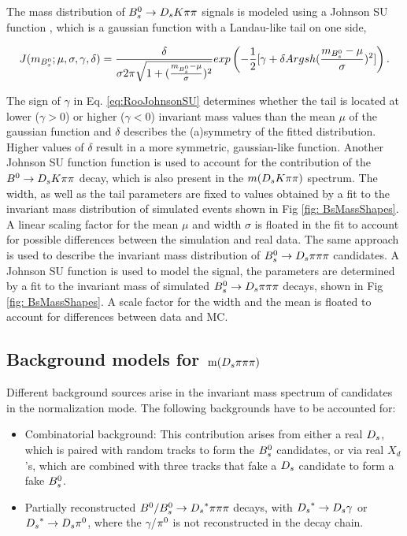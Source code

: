 The mass distribution of ${{B}^0_{s}}\rightarrow{\ensuremath{{D}_{s}}}{\ensuremath{K}}{\ensuremath{\pi}}{\ensuremath{\pi}}$ signals is modeled using a Johnson SU function \cite{10.2307/2332539}, which is a gaussian function with a Landau-like tail on one side,

\begin{equation}
J(m_{{{B}^0_{s}}};\mu,\sigma,\gamma,\delta) = \frac{\delta}{\sigma 2\pi \sqrt{1+(\frac{m_{{{B}^0_{s}}}-\mu}{\sigma})^{2}}} exp \left(-\frac{1}{2}[\gamma + \delta Argsh (\frac{m_{{{B}^0_{s}}} - \mu}{\sigma})^{2}]\right).
\label{eq:RooJohnsonSU}
\end{equation}

 
The sign of $\gamma$ in Eq. \ref{eq:RooJohnsonSU} determines whether the tail is located at lower ($\gamma > 0$) or higher ($\gamma < 0$) invariant mass values than the mean $\mu$ of the gaussian function 
and $\delta$ describes the (a)symmetry of the fitted distribution. Higher values of $\delta$ result in a more symmetric, gaussian-like function.    
Another Johnson SU function function is used to account for the contribution of the ${B}^{0}\rightarrow{\ensuremath{{D}_{s}}}{\ensuremath{K}}{\ensuremath{\pi}}{\ensuremath{\pi}}$ decay, which is also present in the $m({{D}_{s}}{K}{\pi}{\pi})$ spectrum.
The width, as well as the tail parameters are fixed to values obtained by a fit to the invariant mass distribution of simulated events shown in Fig \ref{fig: BsMassShapes}. 
A linear scaling factor for the mean $\mu$ and width $\sigma$ is floated in the fit to account for possible differences between the simulation and real data. \newline
The same approach is used to describe the invariant mass distribution of ${{B}^0_{s}}\rightarrow{\ensuremath{{D}_{s}}}{\ensuremath{\pi}}{\ensuremath{\pi}}{\ensuremath{\pi}}$ candidates. 
A  Johnson SU function is used to model the signal, the parameters are determined by a fit to the invariant mass of simulated ${{B}^0_{s}}\rightarrow{\ensuremath{{D}_{s}}}{\ensuremath{\pi}}{\ensuremath{\pi}}{\ensuremath{\pi}}$ decays, shown in Fig \ref{fig: BsMassShapes}.
A scale factor for the width and the mean is floated to account for differences between data and MC.

\subsection{Background models for $\mathrm{ \,m}({{D}_{s}}{\pi}{\pi}{\pi})$} 
\label{subsec: BkginNorm}
Different background sources arise in the invariant mass spectrum of candidates in the normalization mode. \newline
The following backgrounds have to be accounted for:
\begin{itemize}

\item Combinatorial background: This contribution arises from either a real ${{D}_{s}}$, which is paired with random tracks to form the ${{B}^0_{s}}$ candidates, or via real $X_{d}$'s, which are combined with three tracks that fake a ${{D}_{s}}$ candidate to form a fake ${{B}^0_{s}}$.   

\item Partially reconstructed ${{B}^0}/{{B}^0_{s}}\rightarrow{\ensuremath{{D}_{s}}}^{*}{\pi}{\pi}{\pi}$ decays, with ${{D}_{s}}^{*}\rightarrow{\ensuremath{{D}_{s}}}\gamma$ or ${{D}_{s}}^{*}\rightarrow{\ensuremath{{D}_{s}}}{\ensuremath{{\pi}^0}}$, where the $\gamma$/${{\pi}^0}$ is not reconstructed in the decay chain. 

\end{itemize}

